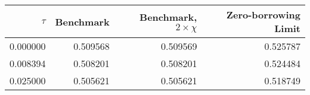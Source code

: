 \begin{tabular}{rrrr}
\toprule
   $\tau$ &  Benchmark &  Benchmark, $2 \times \chi$ &  Zero-borrowing Limit \\
\midrule
 0.000000 &   0.509568 &                    0.509569 &              0.525787 \\
 0.008394 &   0.508201 &                    0.508201 &              0.524484 \\
 0.025000 &   0.505621 &                    0.505621 &              0.518749 \\
\bottomrule
\end{tabular}
